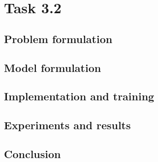 \documentclass{article}
\begin{document}
\section{Task \textbf{3.2}}
\subsection{Problem formulation}
\subsection{Model formulation}
\subsection{Implementation and training}
\subsection{Experiments and results}
\subsection{Conclusion}
\end{document}
